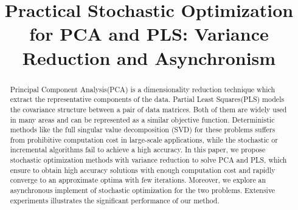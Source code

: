 \documentclass[conference]{IEEEtran}
\begin{document}
%
\title{Practical Stochastic Optimization for PCA and PLS: Variance Reduction and Asynchronism}




\balance


\maketitle


\begin{abstract}
Principal Component Analysis(PCA) is a dimensionality reduction technique which extract the representative components of the data. Partial Least Squares(PLS) models the covariance structure between a pair of data matrices. Both of them are widely used in many areas and can be represented as a similar objective function. Deterministic methods like the full singular value decomposition (SVD) for these problems suffers from prohibitive computation cost in large-scale applications, while the stochastic or incremental algorithms fail to achieve a high accuracy. In this paper, we propose stochastic optimization methods with variance reduction to solve PCA and PLS, which ensure to obtain high accuracy solutions with enough computation cost and rapidly converge to an approximate optima with  few iterations. Moreover, we explore an asynchronous implement of stochastic optimization for the two problems. Extensive experiments illustrates the significant performance of our method.


\end{abstract}


\IEEEpeerreviewmaketitle
\end{document}
